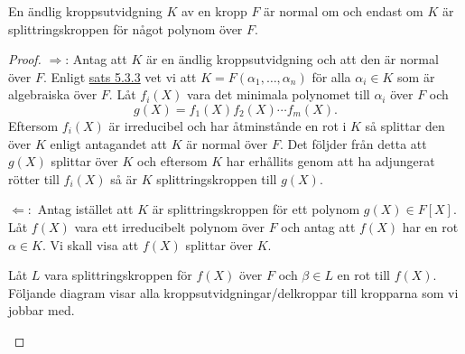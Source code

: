 \documentclass{article}
\theoremstyle{definition}
\begin{document}
\begin{mytheo}{}{}
  En ändlig kroppsutvidgning $K$ av en kropp $F$ är normal om och endast om $K$ är splittringskroppen för något polynom över $F.$
\end{mytheo}
\begin{proof}
  $\Rightarrow$: Antag att $K$ är en ändlig kroppsutvidgning och att den är normal över $F$. Enligt \hyperlink{sats5.3.3}{sats 5.3.3}
  vet vi att $K = F(\alpha_1, \ldots, \alpha_n)$ för alla $\alpha_i \in K$ som är algebraiska över $F.$ Låt $f_i(X)$ vara det minimala polynomet 
  till $\alpha_i$ över $F$ och 
  \[g(X) = f_1(X) f_2(X) \cdots f_m(X).\] 
  Eftersom $f_i(X)$ är irreducibel och har åtminstånde en rot i $K$ så splittar den över $K$ enligt antagandet att $K$ är normal över $F$. Det följder från detta 
  att $g(X)$ splittar över $K$ och eftersom $K$ har erhållits genom att ha adjungerat rötter till $f_i(X)$ så är $K$ splittringskroppen till $g(X).$

  $\Leftarrow:$ Antag istället att $K$ är splittringskroppen för ett polynom $g(X) \in F[X]$. Låt $f(X)$ vara ett irreducibelt polynom över $F$ och antag 
  att $f(X)$ har en rot $\alpha \in K$. Vi skall visa att $f(X)$ splittar över $K$.
  
  Låt $L$ vara splittringskroppen för $f(X)$ över $F$ och $\beta \in L$ en rot till $f(X)$. Följande diagram visar alla kroppsutvidgningar/delkroppar 
  till kropparna som vi jobbar med. 


  \begin{center}
    \newcommand{\mydistance}{.6cm}
\end{center}
\end{proof}
\end{document}
